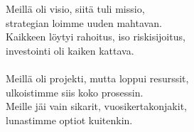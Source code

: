
Meillä oli visio, siitä tuli missio, \\ strategian loimme uuden mahtavan. \\ Kaikkeen löytyi rahoitus, iso riskisijoitus, \\ investointi oli kaiken kattava. \\ \hspace{10mm} \\ Meillä oli projekti, mutta loppui resurssit, \\ ulkoistimme siis koko prosessin. \\ Meille jäi vain sikarit, vuosikertakonjakit, \\ lunastimme optiot kuitenkin.